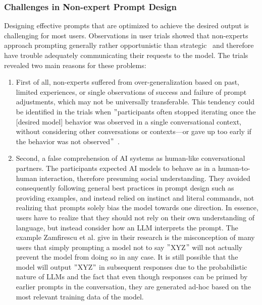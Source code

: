 \subsubsection{Challenges in Non-expert Prompt Design}
Designing effective prompts that are optimized to achieve the desired output is challenging for
most users.
Observations in user trials showed that non-experts approach prompting generally rather
opportunistic than strategic~\cite{zamfirescu-pereira_why_2023} and therefore have trouble
adequately communicating their requests to the model.
The trials revealed two main reasons for these problems:
\begin{enumerate}
    \item First of all, non-experts suffered from over-generalization based on past, limited experiences,
    or single observations of success and failure of prompt adjustments, which may not be universally
    transferable. %
    This tendency could be identified in the trials when \("\)participants often stopped iterating
    once the [desired model] behavior was observed in a single conversational context,
    without considering other conversations or contexts—or gave up too early
    if the behavior was not observed\("\)~\cite[p. 10]{zamfirescu-pereira_why_2023}.
    \item Second, a false comprehension of AI systems as human-like conversational partners.
    The participants expected AI models to behave as in a human-to-human interaction,
    therefore presuming social understanding.
    They avoided consequently following general best practices in prompt design such as providing
    examples, and instead relied on instinct and literal commands, not realizing that prompts
    solely bias the model towards one direction.
    In essence, users have to realize that they should not rely on their own understanding of
    language, but instead consider how an LLM interprets the prompt.
    The example Zamfirescu et al\(.\) give in their research is the misconception of many users
    that simply prompting a model not to say \("\)XYZ\("\) will not actually prevent the model from doing
    so in any case.
    It is still possible that the model will output \("\)XYZ\("\) in subsequent responses due to
    the probabilistic nature of LLMs and the fact that even though responses can be primed
    by earlier prompts in the conversation, they are generated ad-hoc based on the most relevant
    training data of the model.
\end{enumerate}

